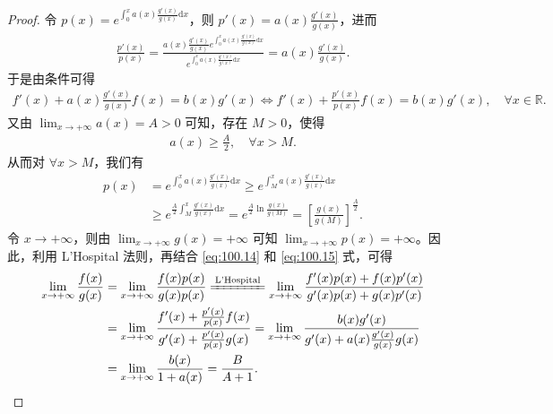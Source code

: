 \documentclass[../../main.tex]{subfiles}
\begin{document}
\begin{proof}
令 \(p(x) = e^{\int_0^x a(x) \frac{g'(x)}{g(x)} \mathrm{d}x}\)，则 \(p'(x) = a(x) \frac{g'(x)}{g(x)}\)，进而
\begin{align}
\frac{p'(x)}{p(x)} = \frac{a(x) \frac{g'(x)}{g(x)} e^{\int_0^x a(x) \frac{g'(x)}{g(x)} \mathrm{d}x}}{e^{\int_0^x a(x) \frac{g'(x)}{g(x)} \mathrm{d}x}} = a(x) \frac{g'(x)}{g(x)}. \label{eq:100.14}
\end{align}
于是由条件可得
\begin{align}
f'(x) + a(x) \frac{g'(x)}{g(x)} f(x) = b(x) g'(x) \Longleftrightarrow f'(x) + \frac{p'(x)}{p(x)} f(x) = b(x) g'(x), \quad \forall x \in \mathbb{R}. \label{eq:100.15}
\end{align}
又由 \(\lim_{x \to +\infty} a(x) = A > 0\) 可知，存在 \(M > 0\)，使得
\begin{align*}
a(x) \geqslant \frac{A}{2}, \quad \forall x > M.
\end{align*}
从而对 \(\forall x > M\)，我们有
\begin{align*}
p(x) &= e^{\int_0^x a(x) \frac{g'(x)}{g(x)} \mathrm{d}x} \geqslant e^{\int_M^x a(x) \frac{g'(x)}{g(x)} \mathrm{d}x} \\
&\geqslant e^{\frac{A}{2} \int_M^x \frac{g'(x)}{g(x)} \mathrm{d}x} = e^{\frac{A}{2} \ln \frac{g(x)}{g(M)}} = \left[ \frac{g(x)}{g(M)} \right]^{\frac{A}{2}}.
\end{align*}
令 \(x \to +\infty\)，则由 \(\lim_{x \to +\infty} g(x) = +\infty\) 可知 \(\lim_{x \to +\infty} p(x) = +\infty\)。因此，利用 L'Hospital 法则，再结合 \eqref{eq:100.14} 和 \eqref{eq:100.15} 式，可得
\begin{align*}
\lim_{x \to +\infty} \frac{f(x)}{g(x)} &= \lim_{x \to +\infty} \frac{f(x) p(x)}{g(x) p(x)} \xlongequal{\text{L'Hospital}} \lim_{x \to +\infty} \frac{f'(x) p(x) + f(x) p'(x)}{g'(x) p(x) + g(x) p'(x)} \\
&= \lim_{x \to +\infty} \frac{f'(x) + \frac{p'(x)}{p(x)} f(x)}{g'(x) + \frac{p'(x)}{p(x)} g(x)} = \lim_{x \to +\infty} \frac{b(x) g'(x)}{g'(x) + a(x) \frac{g'(x)}{g(x)} g(x)} \\
&= \lim_{x \to +\infty} \frac{b(x)}{1 + a(x)} = \frac{B}{A + 1}.
\end{align*}
\end{proof}
\end{document}
